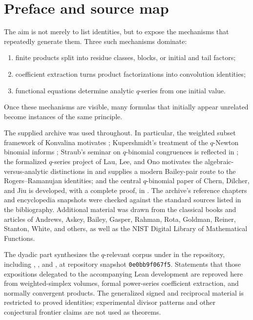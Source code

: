 \documentclass[11pt,oneside,openany]{book}
\theoremstyle{definition}
\theoremstyle{remark}
\begin{document}
\chapter*{Preface and source map}
The aim is not merely to list identities, but to expose the mechanisms that repeatedly generate them.  Three such mechanisms dominate:
\begin{enumerate}
\item finite products split into residue classes, blocks, or initial and tail factors;
\item coefficient extraction turns product factorizations into convolution identities;
\item functional equations determine analytic $q$-series from one initial value.
\end{enumerate}
Once these mechanisms are visible, many formulas that initially appear unrelated become instances of the same principle.

The supplied archive was used throughout.  In particular, the weighted subset framework of Konvalina motivates ; Kupershmidt's treatment of the $q$-Newton binomial informs ; Straub's seminar on $q$-binomial congruences is reflected in ; the formalized $q$-series project of Lau, Lee, and Ono motivates the algebraic-versus-analytic distinctions in  and supplies a modern Bailey-pair route to the Rogers--Ramanujan identities; and the central $q$-binomial paper of Chern, Dilcher, and Jiu is developed, with a complete proof, in .  The archive's reference chapters and encyclopedia snapshots were checked against the standard sources listed in the bibliography.  Additional material was drawn from the classical books and articles of Andrews, Askey, Bailey, Gasper, Rahman, Rota, Goldman, Reiner, Stanton, White, and others, as well as the NIST Digital Library of Mathematical Functions.

The dyadic part synthesizes the $q$-relevant  corpus under
 in the  repository,
including ,
, and
, at repository snapshot
\texttt{0e0bb9f067f5}.  Statements that those
expositions delegated to the accompanying Lean development are reproved here
from weighted-simplex volumes, formal power-series coefficient extraction,
and normally convergent products.  The generalized signed and reciprocal
material is restricted to proved identities; experimental divisor patterns
and other conjectural frontier claims are not used as theorems.
\end{document}
